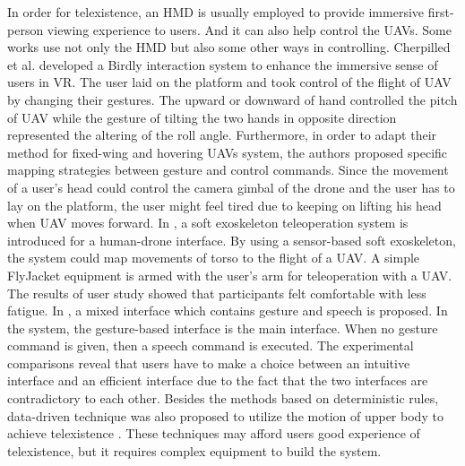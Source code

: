 \documentclass[journal]{IEEEtran}
\begin{document}
In order for telexistence, an HMD is usually employed to provide immersive first-person 
viewing experience to users. And it can also help control the UAVs. Some works use 
not only the HMD but also some other ways in controlling. 
Cherpilled et al. \cite{DBLP:journals/corr/CherpillodMF17} developed a 
Birdly interaction system to enhance the immersive sense of users in VR. The user laid 
on the platform and took control of the flight of UAV by changing their gestures. The 
upward or downward of hand controlled the pitch of UAV while the gesture of tilting the 
two hands in opposite direction represented the altering of the roll angle. Furthermore, 
in order to adapt their method for fixed-wing and hovering UAVs system, the authors 
proposed specific mapping strategies between gesture and control commands. Since the 
movement of a user’s head could control the camera gimbal of the drone and the user has to 
lay on the platform, the user might feel tired due to keeping on lifting his head when 
UAV moves forward. In \cite{8304759}, a soft exoskeleton teleoperation system is introduced for a 
human-drone interface. By using a sensor-based soft exoskeleton, the system could map 
movements of torso to the flight of a UAV. A simple FlyJacket equipment is armed with 
the user’s arm for teleoperation with a UAV. The results of user study showed that 
participants felt comfortable with less fatigue. In \cite{mci/Herrmann2018}, a mixed interface which contains 
gesture and speech is proposed. In the system, the gesture-based interface is the main 
interface. When no gesture command is given, then a speech command is executed. The 
experimental comparisons reveal that users have to make a choice between an intuitive 
interface and an efficient interface due to the fact that the two interfaces are contradictory 
to each other. Besides the methods based on deterministic rules, data-driven technique 
was also proposed to utilize the motion of upper body to achieve 
telexistence \cite{Miehlbradt7913}. These 
techniques may afford users good experience of telexistence, 
but it requires complex 
equipment to build the system.
\end{document}
